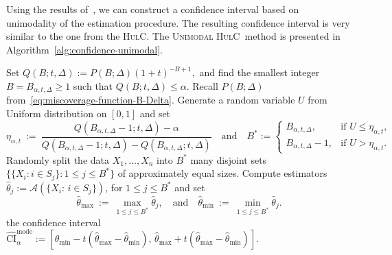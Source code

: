\documentclass{article}
\newcommand{\hulcnospace}{\textsc{HulC}}
\newcommand{\uhulc}{\textsc{Unimodal HulC}~}
\newcommand{\uhulcnospace}{\textsc{Unimodal HulC}}
\numberwithin{myalgctr}{section}
\begin{document}
Using the results of~\cite{lanke1974interval}, we can construct a confidence interval based on unimodality of the estimation procedure. The resulting confidence interval is very similar to the one from the \hulcnospace. 
The \uhulc method is presented in Algorithm~\ref{alg:confidence-unimodal}.
\begin{algorithm}[h]
    \caption{Confidence Interval based on Unimodality and Median Bias (\uhulcnospace)}
    \label{alg:confidence-unimodal}
    \SetAlgoLined
    \SetEndCharOfAlgoLine{}
    Set $Q(B; t, \Delta) := P(B;\Delta)(1 + t)^{-B + 1},$
    and find the smallest integer $B = B_{\alpha,t,\Delta}\ge1$ such that $Q(B; t, \Delta) \le \alpha$. Recall $P(B; \Delta)$ from~\eqref{eq:miscoverage-function-B-Delta}.\;
    Generate a random variable $U$ from Uniform distribution on $[0,1]$ and set
    \begin{equation}\label{eq:definition-eta}
    \eta_{\alpha,t} ~:=~ \frac{Q(B_{\alpha,t,\Delta}-1;t,\Delta) - \alpha}{Q(B_{\alpha,t,\Delta}-1;t,\Delta) - Q(B_{\alpha,t,\Delta};t,\Delta)}\quad\mbox{and}\quad B^* := \begin{cases} B_{\alpha,t,\Delta}, &\mbox{if }U \le \eta_{\alpha,t},\\
    B_{\alpha,t,\Delta} - 1, &\mbox{if }U > \eta_{\alpha,t}.
    \end{cases} 
    \end{equation}\vspace{-0.2in}\;
  	Randomly split the data $X_1, \ldots, X_n$ into $B^*$ many disjoint sets $\{\{X_i:i\in S_j\}: 1\le j\le B^*\}$ of approximately equal sizes.\;
  	Compute estimators $\widehat{\theta}_j := \mathcal{A}(\{X_i:\,i\in S_j\})$, for $1\le j\le B^*$ and set
  	\[
  	\widehat{\theta}_{\max} ~:=~ \max_{1\le j\le B^*}\widehat{\theta}_j,\quad\mbox{and}\quad \widehat{\theta}_{\min} ~:=~ \min_{1\le j\le B^*}\widehat{\theta}_j.
  	\]\vspace{-0.2in}\;
      \Return the confidence interval 
      $\widehat{\mathrm{CI}}_{\alpha}^{\mathrm{mode}} := [\widehat{\theta}_{\min} - t(\widehat{\theta}_{\max} - \widehat{\theta}_{\min}),\, \widehat{\theta}_{\max} + t(\widehat{\theta}_{\max} - \widehat{\theta}_{\min})].$
\end{algorithm}
\end{document}
